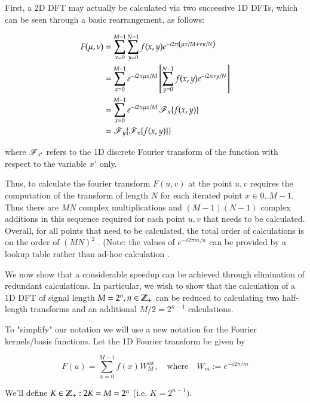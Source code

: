 		
		First, a 2D DFT may actually be calculated via two successive 1D DFTs, which can be
		seen through a basic rearrangement, as follows:
		
		\begin{align}
		F(\mu,\nu) &= \sum_{x=0}^{M-1} \sum_{y=0}^{N-1} f(x,y) e^{-i2\pi \left(\mu x/M + \nu y/N\right)} \\
			   &= \sum_{x=0}^{M-1} e^{-i2\pi \mu x/M} \left[ \sum_{y=0}^{N-1} f(x,y)e^{-i2\pi \nu y/N} \right] \\
			   &= \sum_{x=0}^{M-1} e^{-i2\pi \mu x/M} \operatorname{\mathscr{F}}_x\{ f(x,y)\} \\
			   &= \operatorname{\mathscr{F}}_y\{\operatorname{\mathscr{F}}_x \{f(x,y)\} \}
		\end{align}
		
		where $\operatorname{\mathscr{F}}_{x'}$ refers to the 1D discrete Fourier transform of the function with respect to
		the variable $x'$ only.
		
		Thus, to calculate the fourier transform $F(u,v)$ at the point $u,v$
		requires the computation of the transform of length $N$ for each iterated point $x \in 0..M-1$. Thus there are $MN$ complex multiplications and $(M-1)(N-1)$ complex additions in this sequence required for each point $u,v$ that needs to be calculated. Overall, for all points that need to be calculated, the total order of calculations is on the order of $(MN)^2$ . (Note: the values of $e^{-i2\pi m/n}$ can be provided by a lookup table rather than ad-hoc calculation .
		
		We now show that a considerable speedup can be achieved through elimination of redundant calculations. In particular, we wish to show that the calculation of a 1D DFT of signal length $M=2^n, n \in \mathbb{Z}_{+}$ can be reduced to calculating two half-length transforms and an additional $M/2 = 2^{n-1}$ calculations.
		
		
		To "simplify" our notation we will use a new notation for the Fourier kernels/basis functions.
		Let the 1D Fourier transform be given by
		
		\begin{equation} \label{FFT-defineW}
		F(u) = \sum_{x=0}^{M-1} f(x) W_M^{ux},\quad \textrm{where} \quad W_m := e^{-i2\pi/m}
		\end{equation} 
		
		We'll define $K \in \mathbb{Z}_{+} : 2K = M = 2^n$ (i.e. $K = 2^{n-1})$.
		
